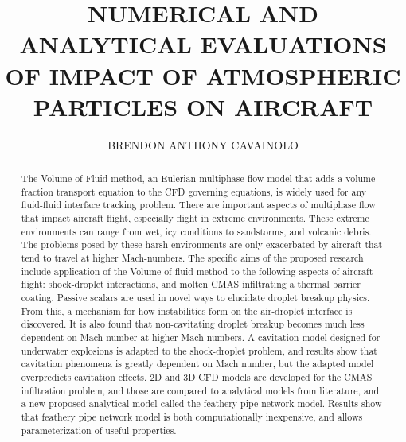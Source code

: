 \documentclass{UCF_ETD}
\title{NUMERICAL AND ANALYTICAL EVALUATIONS OF IMPACT OF ATMOSPHERIC PARTICLES ON AIRCRAFT} %
\author{BRENDON ANTHONY CAVAINOLO} %
\begin{document}
\frontmatter

\maketitle


\begin{abstract}
\label{sec:abstract}
The Volume-of-Fluid method, an Eulerian multiphase flow model that adds a volume fraction transport equation to the CFD governing equations, is widely used for any fluid-fluid interface tracking problem. There are important aspects of multiphase flow that impact aircraft flight, especially flight in extreme environments. These extreme environments can range from wet, icy conditions to sandstorms, and volcanic debris. The problems posed by these harsh environments are only exacerbated by aircraft that tend to travel at higher Mach-numbers. The specific aims of the proposed research include application of the Volume-of-fluid method to the following aspects of aircraft flight: shock-droplet interactions, and molten CMAS infiltrating a thermal barrier coating. Passive scalars are used in novel ways to elucidate droplet breakup physics. From this, a mechanism for how instabilities form on the air-droplet interface is discovered. It is also found that non-cavitating droplet breakup becomes much less dependent on Mach number at higher Mach numbers. A cavitation model designed for underwater explosions is adapted to the shock-droplet problem, and results show that cavitation phenomena is greatly dependent on Mach number, but the adapted model overpredicts cavitation effects. 2D and 3D CFD models are developed for the CMAS infiltration problem, and those are compared to analytical models from literature, and a new proposed analytical model called the feathery pipe network model. Results show that feathery pipe network model is both computationally inexpensive, and allows parameterization of useful properties.%
\end{abstract}

\dedication{Dedicated to my wonderful wife, Alyssa Mickle. She is my partner, my best friend, and the love of my life.}
\end{document}
